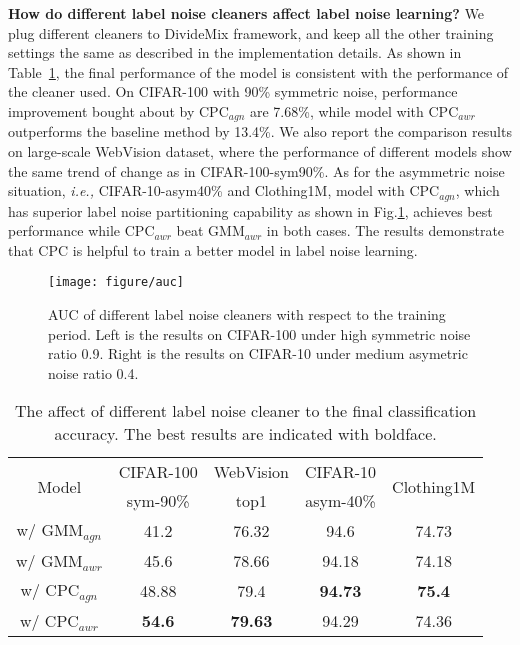\documentclass{article} \usepackage{iclr2023_conference,times}
\begin{document}
\textbf{How do different label noise cleaners affect label noise learning?} We plug different cleaners to DivideMix framework, and keep all the other training settings the same as described in the implementation details. As shown in Table~\ref{table-ablation}, the final performance of the model is consistent with the performance of the cleaner used. On CIFAR-100 with 90\% symmetric noise, performance improvement bought about by CPC$_{agn}$ are 7.68\%, while model with CPC$_{awr}$ outperforms the baseline method by 13.4\%. We also report the comparison results on large-scale WebVision dataset, where the performance of different models show the same trend of change as in CIFAR-100-sym90\%. As for the asymmetric noise situation, \emph{i.e.,} CIFAR-10-asym40\% and Clothing1M, model with CPC$_{agn}$, which has superior label noise partitioning capability as shown in Fig.\ref{fig:auc}, achieves best performance while CPC$_{awr}$ beat GMM$_{awr}$ in both cases.  The results demonstrate that CPC is helpful to train a better model in label noise learning.
\begin{figure}[t]
\centering
  \texttt{[image: figure/auc]}
    \vspace{-2\baselineskip}
  \caption{ AUC of different label noise cleaners with respect to the training period. Left is the results on CIFAR-100 under high symmetric noise ratio 0.9. Right is the results on CIFAR-10 under medium asymetric noise ratio 0.4.}
   \vspace{-1\baselineskip}
   \label{fig:auc}
\end{figure}

\begin{table}[t]
\caption{The affect of different label noise cleaner to the final classification accuracy. The best results are indicated with  boldface.}
\label{table-ablation}
\small
\begin{center}
\begin{tabular}{c|c c c c}
\multirow{2}{*}{Model}& \multicolumn{1}{c}{CIFAR-100} & {WebVision} &  CIFAR-10 & \multirow{2}{*}{Clothing1M} \\
 & sym-90\% & top1 & asym-40\%  &\\ \midrule
w/ GMM$_{agn}$ & 41.2 &76.32 & 94.6 & 74.73  \\
w/ GMM$_{awr}$ & 45.6 & 78.66 & 94.18 & 74.18 \\
w/ CPC$_{agn}$ & 48.88  & 79.4 & \textbf{94.73} & \textbf{75.4} \\
w/ CPC$_{awr}$ & \textbf{54.6}  & \textbf{79.63} & 94.29 & 74.36  \end{tabular}\end{center}
\vspace{-2\baselineskip}
\end{table}
\end{document}
